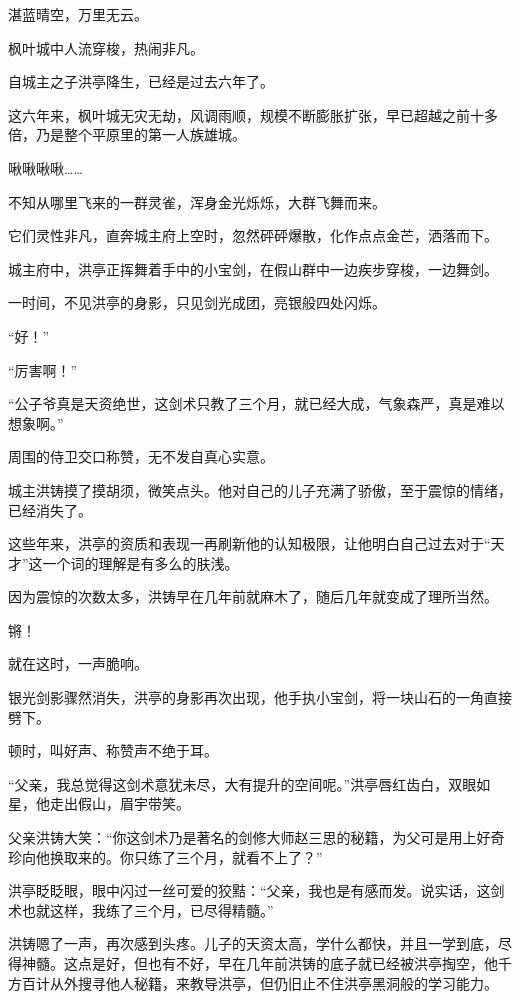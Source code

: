 
\begin{this_body}

湛蓝晴空，万里无云。

枫叶城中人流穿梭，热闹非凡。

自城主之子洪亭降生，已经是过去六年了。

这六年来，枫叶城无灾无劫，风调雨顺，规模不断膨胀扩张，早已超越之前十多倍，乃是整个平原里的第一人族雄城。

啾啾啾啾……

不知从哪里飞来的一群灵雀，浑身金光烁烁，大群飞舞而来。

它们灵性非凡，直奔城主府上空时，忽然砰砰爆散，化作点点金芒，洒落而下。

城主府中，洪亭正挥舞着手中的小宝剑，在假山群中一边疾步穿梭，一边舞剑。

一时间，不见洪亭的身影，只见剑光成团，亮银般四处闪烁。

“好！”

“厉害啊！”

“公子爷真是天资绝世，这剑术只教了三个月，就已经大成，气象森严，真是难以想象啊。”

周围的侍卫交口称赞，无不发自真心实意。

城主洪铸摸了摸胡须，微笑点头。他对自己的儿子充满了骄傲，至于震惊的情绪，已经消失了。

这些年来，洪亭的资质和表现一再刷新他的认知极限，让他明白自己过去对于“天才”这一个词的理解是有多么的肤浅。

因为震惊的次数太多，洪铸早在几年前就麻木了，随后几年就变成了理所当然。

锵！

就在这时，一声脆响。

银光剑影骤然消失，洪亭的身影再次出现，他手执小宝剑，将一块山石的一角直接劈下。

顿时，叫好声、称赞声不绝于耳。

“父亲，我总觉得这剑术意犹未尽，大有提升的空间呢。”洪亭唇红齿白，双眼如星，他走出假山，眉宇带笑。

父亲洪铸大笑：“你这剑术乃是著名的剑修大师赵三思的秘籍，为父可是用上好奇珍向他换取来的。你只练了三个月，就看不上了？”

洪亭眨眨眼，眼中闪过一丝可爱的狡黠：“父亲，我也是有感而发。说实话，这剑术也就这样，我练了三个月，已尽得精髓。”

洪铸嗯了一声，再次感到头疼。儿子的天资太高，学什么都快，并且一学到底，尽得神髓。这点是好，但也有不好，早在几年前洪铸的底子就已经被洪亭掏空，他千方百计从外搜寻他人秘籍，来教导洪亭，但仍旧止不住洪亭黑洞般的学习能力。


\end{this_body}
